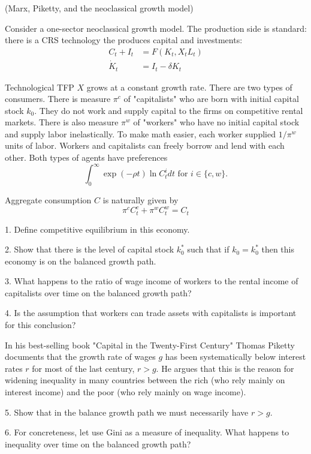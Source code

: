 (Marx, Piketty, and the neoclassical growth model)

Consider a one-sector neoclassical growth model. The production side is standard: there is a CRS technology the produces capital and investments:
$$
\begin{aligned}
C_t+I_t & =F\left(K_t, X_t L_t\right) \\
\dot{K}_t & =I_t-\delta K_t
\end{aligned}
$$

Technological TFP $X$ grows at a constant growth rate.
There are two types of consumers. There is measure $\pi^c$ of "capitalists" who are born with initial capital stock $k_0$. They do not work and supply capital to the firms on competitive rental markets. There is also measure $\pi^w$ of "workers" who have no initial capital stock and supply labor inelastically. To make math easier, each worker supplied $1 / \pi^w$ units of labor. Workers and capitalists can freely borrow and lend with each other. Both types of agents have preferences
$$
\int_0^{\infty} \exp (-\rho t) \ln C_t^i d t \text { for } i \in\{c, w\} .
$$

Aggregate consumption $C$ is naturally given by
$$
\pi^c C_t^c+\pi^w C_t^w=C_t
$$

1. Define competitive equilibrium in this economy.

2. Show that there is the level of capital stock $k_0^*$ such that if $k_0=k_0^*$ then this economy is on the balanced growth path.

3. What happens to the ratio of wage income of workers to the rental income of capitalists over time on the balanced growth path?

4. Is the assumption that workers can trade assets with capitalists is important for this conclusion?

In his best-selling book "Capital in the Twenty-First Century" Thomas Piketty documents that the growth rate of wages $g$ has been systematically below interest rates $r$ for most of the last century, $r>g$. He argues that this is the reason for widening inequality in many countries between the rich (who rely mainly on interest income) and the poor (who rely mainly on wage income).

5. Show that in the balance growth path we must necessarily have $r>g$.

6. For concreteness, let use Gini as a measure of inequality. What happens to inequality over time on the balanced growth path?